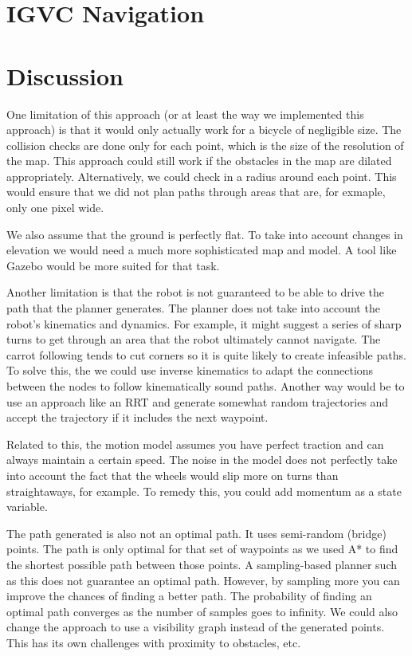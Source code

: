 \documentclass[12pt]{article}
\begin{document}
\newpage
\singlespacing
\section{IGVC Navigation}
\setlength{\parindent}{1cm}

\newpage
\singlespacing
\section{Discussion}
\setlength{\parindent}{1cm}

One limitation of this approach (or at least the way we implemented this approach) is that it would only actually work for a bicycle of negligible size. The collision checks are done only for each point, which is the size of the resolution of the map. This approach could still work if the obstacles in the map are dilated appropriately. Alternatively, we could check in a radius around each point. This would ensure that we did not plan paths through areas that are, for exmaple, only one pixel wide.

We also assume that the ground is perfectly flat. To take into account changes in elevation we would need a much more sophisticated map and model. A tool like Gazebo would be more suited for that task.

Another limitation is that the robot is not guaranteed to be able to drive the path that the planner generates. The planner does not take into account the robot's kinematics and dynamics. For example, it might suggest a series of sharp turns to get through an area that the robot ultimately cannot navigate. The carrot following tends to cut corners so it is quite likely to create infeasible paths. To solve this, the we could use inverse kinematics to adapt the connections between the nodes to follow kinematically sound paths. Another way would be to use an approach like an RRT and generate somewhat random trajectories and accept the trajectory if it includes the next waypoint.  

Related to this, the motion model assumes you have perfect traction and can always maintain a certain speed. The noise in the model does not perfectly take into account the fact that the wheels would slip more on turns than straightaways, for example. To remedy this, you could add momentum as a state variable.

The path generated is also not an optimal path. It uses semi-random (bridge) points. The path is only optimal for that set of waypoints as we used A* to find the shortest possible path between those points. A sampling-based planner such as this does not guarantee an optimal path. However, by sampling more you can improve the chances of finding a better path. The probability of finding an optimal path converges as the number of samples goes to infinity. We could also change the approach to use a visibility graph instead of the generated points. This has its own challenges with proximity to obstacles, etc.  


 
\end{document}
